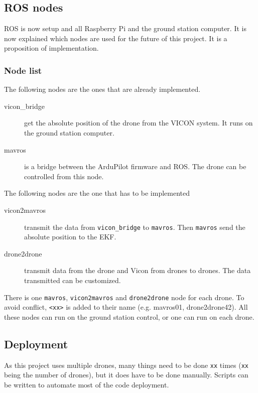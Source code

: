 \subsection{ROS nodes}
ROS is now setup and all Raspberry Pi and the ground station computer.
It is now explained which nodes are used for the future of this project.
It is a proposition of implementation.

\subsubsection{Node list}

The following nodes are the ones that are already implemented.

\begin{description}
    \item[vicon\_bridge] get the absolute position of the drone from the VICON system.
          It runs on the ground station computer.
    \item[mavros] is a bridge between the ArduPilot firmware and ROS.
          The drone can be controlled from this node.
\end{description}

The following nodes are the one that has to be implemented

\begin{description}
    \item[vicon2mavros] transmit the data from \texttt{vicon\_bridge} to \texttt{mavros}.
          Then \texttt{mavros} send the absolute position to the EKF.
    \item[drone2drone] transmit data from the drone and Vicon from drones to drones.
          The data transmitted can be customized.
\end{description}

There is one \texttt{mavros}, \texttt{vicon2mavros} and \texttt{drone2drone}
node for each drone. To avoid conflict, \texttt{<xx>} is added to their name (e.g. mavros01, drone2drone42).
All these nodes can run on the ground station control, or one can run on each drone.

\subsection{Deployment}
As this project uses multiple drones, many things need to be done \texttt{xx} times (\texttt{xx} being the number of drones), but it does have to be done manually.
Scripts can be written to automate most of the code deployment.

